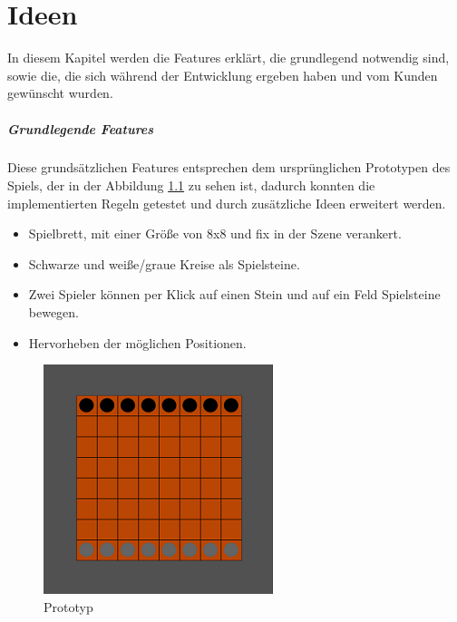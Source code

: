 
\chapter{Ideen}
\label{ch:Entwurf}
In diesem Kapitel werden die Features erklärt, die grundlegend notwendig sind, sowie die, die sich während der Entwicklung ergeben haben und vom Kunden gewünscht wurden.

\label{ch:Entwurf:sec:1.Konzept}
\paragraph{Grundlegende Features}
 Diese grundsätzlichen Features entsprechen dem ursprünglichen Prototypen des Spiels, der in der Abbildung \ref{fig:Prototyp} zu sehen ist, dadurch konnten die implementierten Regeln getestet und durch  zusätzliche Ideen erweitert werden.
 	\begin{itemize}
 		\item Spielbrett, mit einer Größe von 8x8 und fix in der Szene verankert.
 		\item Schwarze und weiße/graue Kreise als Spielsteine.
 		\item Zwei Spieler können per Klick auf einen Stein und auf ein Feld Spielsteine bewegen.
 		\item Hervorheben der möglichen Positionen.
 	\end{itemize}
\begin{figure}[h]
	\centering
	\includegraphics{img/Prototyp2}
	\caption{Prototyp}
	\label{fig:Prototyp}
\end{figure}
